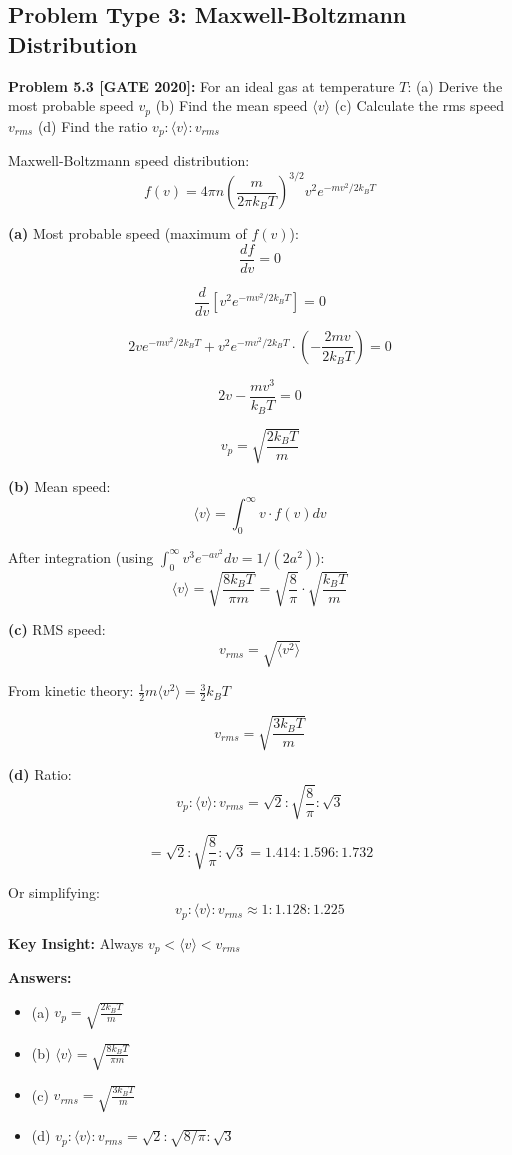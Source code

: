\documentclass[12pt,a4paper]{article}
\begin{document}
\subsection{Problem Type 3: Maxwell-Boltzmann Distribution}

\textbf{Problem 5.3 [GATE 2020]:} For an ideal gas at temperature $T$:
(a) Derive the most probable speed $v_p$
(b) Find the mean speed $\langle v \rangle$
(c) Calculate the rms speed $v_{rms}$
(d) Find the ratio $v_p : \langle v \rangle : v_{rms}$

\begin{solution}
Maxwell-Boltzmann speed distribution:
$$f(v) = 4\pi n\left(\frac{m}{2\pi k_BT}\right)^{3/2} v^2 e^{-mv^2/2k_BT}$$

\textbf{(a)} Most probable speed (maximum of $f(v)$):
$$\frac{df}{dv} = 0$$

$$\frac{d}{dv}\left[v^2 e^{-mv^2/2k_BT}\right] = 0$$

$$2ve^{-mv^2/2k_BT} + v^2 e^{-mv^2/2k_BT} \cdot \left(-\frac{2mv}{2k_BT}\right) = 0$$

$$2v - \frac{mv^3}{k_BT} = 0$$

$$v_p = \sqrt{\frac{2k_BT}{m}}$$

\textbf{(b)} Mean speed:
$$\langle v \rangle = \int_0^{\infty} v \cdot f(v)dv$$

After integration (using $\int_0^{\infty} v^3 e^{-av^2}dv = 1/(2a^2)$):
$$\langle v \rangle = \sqrt{\frac{8k_BT}{\pi m}} = \sqrt{\frac{8}{\pi}} \cdot \sqrt{\frac{k_BT}{m}}$$

\textbf{(c)} RMS speed:
$$v_{rms} = \sqrt{\langle v^2 \rangle}$$

From kinetic theory: $\frac{1}{2}m\langle v^2 \rangle = \frac{3}{2}k_BT$

$$v_{rms} = \sqrt{\frac{3k_BT}{m}}$$

\textbf{(d)} Ratio:
$$v_p : \langle v \rangle : v_{rms} = \sqrt{2} : \sqrt{\frac{8}{\pi}} : \sqrt{3}$$

$$= \sqrt{2} : \sqrt{\frac{8}{\pi}} : \sqrt{3} = 1.414 : 1.596 : 1.732$$

Or simplifying:
$$v_p : \langle v \rangle : v_{rms} \approx 1 : 1.128 : 1.225$$

\textbf{Key Insight:} Always $v_p < \langle v \rangle < v_{rms}$

\textbf{Answers:}
\begin{itemize}
    \item (a) $v_p = \sqrt{\frac{2k_BT}{m}}$
    \item (b) $\langle v \rangle = \sqrt{\frac{8k_BT}{\pi m}}$
    \item (c) $v_{rms} = \sqrt{\frac{3k_BT}{m}}$
    \item (d) $v_p : \langle v \rangle : v_{rms} = \sqrt{2} : \sqrt{8/\pi} : \sqrt{3}$
\end{itemize}
\end{solution}
\end{document}
